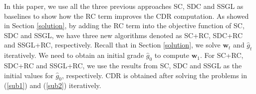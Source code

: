 \documentclass[journal]{IEEEtran}
\begin{document}
   In this paper, we use all the three previous approaches SC, SDC and SSGL as baselines to show how the RC term improves the CDR computation. As showed in Section \ref{solution}, by adding the RC term into the objective function of SC, SDC and SSGL,  we have three new algorithms  denoted as SC+RC, SDC+RC and SSGL+RC, respectively.   Recall that in Section \ref{solution}, we solve $\textbf{w}_t$ and $\hat{g}_t$ iteratively. We need to obtain an initial grade $\hat{g}_0$ to compute $\textbf{w}_1$. For SC+RC, SDC+RC and SSGL+RC, we use the results from SC, SDC and SSGL as the initial values for $\hat{g}_0$, respectively. 
    CDR is obtained after  solving the problems in (\ref{sub1}) and (\ref{sub2}) iteratively.
%    
%    
%    
    
\end{document}
